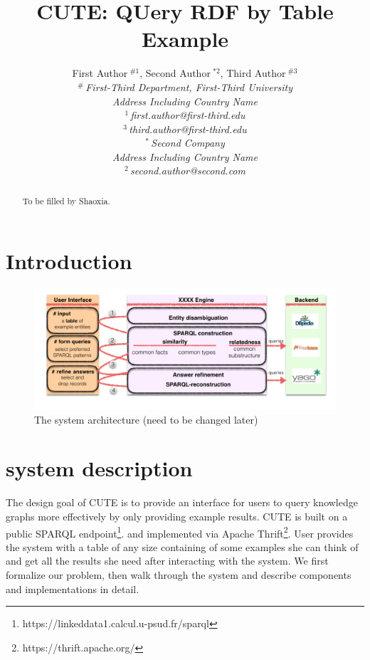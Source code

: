 \documentclass[10pt,conference,letterpaper]{IEEEtran}
\title{CUTE: QUery RDF by Table Example}
\author{%
{First Author{\small $~^{\#1}$}, Second Author{\small $~^{*2}$}, Third Author{\small $~^{\#3}$} }%
\vspace{1.6mm}\\
\fontsize{10}{10}\selectfont\itshape
$^{\#}$\,First-Third Department, First-Third University\\
Address Including Country Name\\
\fontsize{9}{9}\selectfont\ttfamily\upshape
%
$^{1}$\,first.author@first-third.edu\\
$^{3}$\,third.author@first-third.edu%
\vspace{1.2mm}\\
\fontsize{10}{10}\selectfont\rmfamily\itshape
$^{*}$\,Second Company\\
Address Including Country Name\\
\fontsize{9}{9}\selectfont\ttfamily\upshape
$^{2}$\,second.author@second.com
}
\newcommand{\res}{CUTE }
\begin{document}
\maketitle
%




\begin{abstract} 
To be filled by Shaoxia.
\end{abstract}

%
\section{Introduction}
%




\newpage

\null\newpage

\begin{figure}
\centering
	\includegraphics[scale=0.6]{figure/pipeline2}
	\caption{The system architecture (need to be changed  later)}
	\label{pipe}
\end{figure}

\section{system description}

The design goal of \res is to provide an interface for users to query knowledge graphs more effectively by only providing example results. \res is built on a public SPARQL endpoint\footnote{https://linkeddata1.calcul.u-psud.fr/sparql}. and implemented via Apache Thrift\footnote{https://thrift.apache.org/}. User provides the system with a table of any size containing of some examples she can think of and get all the results she need after interacting with the system. We first formalize our problem, then walk through the system and describe components and implementations in detail.
\end{document}
